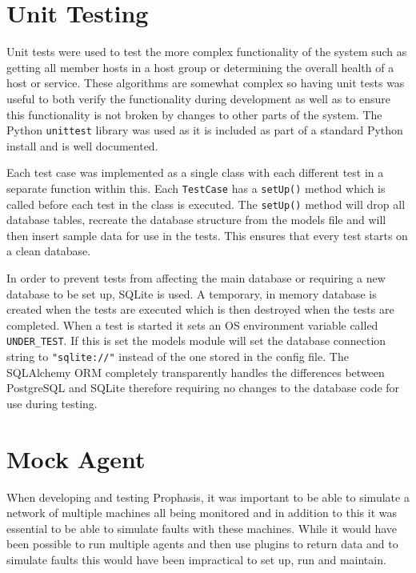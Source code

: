 \documentclass[bsc,logo,twoside,parskip,singlespacing,notimes]{infthesis}
\begin{document}
\section{Unit Testing}

	Unit tests were used to test the more complex functionality of the system such
	as getting all member hosts in a host group or determining the overall health
	of a host or service.  These algorithms are somewhat complex so having unit
	tests was useful to both verify the functionality during development as well
	as to ensure this functionality is not broken by changes to other parts of the
	system.  The Python \texttt{unittest} library was used as it is included as part of
	a standard Python install and is well documented.


	Each test case was implemented as a single class with each different test in a
	separate function within this.  Each \texttt{TestCase} has a \texttt{setUp()}
	method which is called before each test in the class is executed.  The
	\texttt{setUp()} method will drop all database tables, recreate the database
	structure from the models file and will then insert sample data for use in the
	tests.  This ensures that every test starts on a clean database.


	In order to prevent tests from affecting the main database or requiring a new
	database to be set up, SQLite is used.  A temporary, in memory database is
	created when the tests are executed which is then destroyed when the tests are
	completed.  When a test is started it sets an OS environment variable called
	\texttt{UNDER\_TEST}.  If this is set the models module will set the database
	connection string to \texttt{"sqlite://"} instead of the one stored in the config
	file. The SQLAlchemy ORM completely transparently handles the differences
	between PostgreSQL and SQLite therefore requiring no changes to the database
	code for use during testing.


\section{Mock Agent}

	When developing and testing Prophasis, it was important to be able to simulate a
	network of multiple machines all being monitored and in addition to this it
	was essential to be able to simulate faults with these machines. While it would
	have been possible to run multiple agents and then use plugins to return data
	and to simulate faults this would have been impractical to set up, run and maintain.
\end{document}
